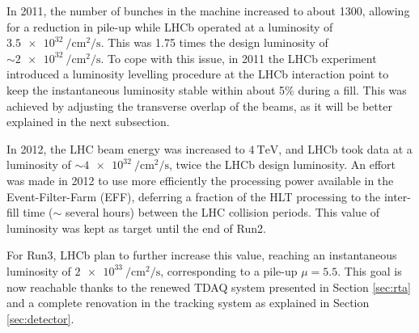 
In 2011, the number of bunches in the machine increased to about 1300, allowing for a reduction in pile-up while LHCb operated at a luminosity of $\SI{3.5e32}{\per\centi\meter\squared\per\second}$. This was 1.75 times the design luminosity of $\sim \SI{2e32}{\per\centi\meter\squared\per\second}$. %
To cope with this issue, in 2011 the LHCb experiment introduced a luminosity levelling procedure at the LHCb interaction point to keep the instantaneous luminosity stable within about 5\% during a fill. This was achieved by adjusting the transverse overlap of the beams, as it will be better explained in the next subsection.

In 2012, the LHC beam energy was increased to $\SI{4}{\tera\eV}$, and LHCb took data at a luminosity of $\sim \SI{4e32}{\per\centi\meter\squared\per\second}$, twice the LHCb design luminosity. An effort was made in 2012 to use more efficiently the processing power available in the Event-Filter-Farm (EFF), deferring a fraction of the HLT processing to the inter-fill time ($\sim$ several hours) between the LHC collision periods. This value of luminosity was kept as target until the end of Run2.  


For Run3, LHCb plan to further increase this value, reaching an instantaneous luminosity of $\SI{2e33}{\per\centi\meter\squared\per\second}$, corresponding to a pile-up $\mu=5.5$.
This goal is now reachable thanks to the renewed TDAQ system presented in Section \ref{sec:rta} and a complete renovation in the tracking system as explained in Section \ref{sec:detector}.

